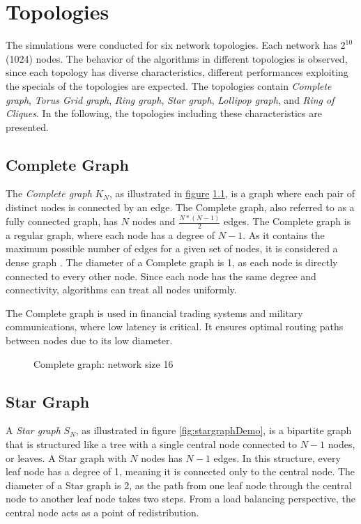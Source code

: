 \chapter{Topologies}\label{chap:topologies}
The simulations were conducted for six network topologies. Each network has $2^{10}$ (1024) nodes. The behavior of the algorithms in different topologies is observed, since each topology has diverse characteristics, different performances exploiting the specials of the topologies are expected. The topologies contain \textit{Complete graph}, \textit{Torus Grid graph}, \textit{Ring graph}, \textit{Star graph}, \textit{Lollipop graph}, and \textit{Ring of Cliques}. In the following, the topologies including these characteristics are presented.

\section{Complete Graph}\label{sec:2completegraph}
The \textit{Complete graph} $K_N$, as illustrated in \hyperref[fig:completegraphDemo]{figure} \ref{fig:completegraphDemo}, is a graph where each pair of distinct nodes is connected by an edge. The Complete graph, also referred to as a fully connected graph, has $N$ nodes and $\frac{N*(N-1)}{2}$ edges. The Complete graph is a regular graph, where each node has a degree of $N-1$. As it contains the maximum possible number of edges for a given set of nodes, it is considered a dense graph \cite{GraphTheorySchindelhaauer2021}. The diameter of a Complete graph is 1, as each node is directly connected to every other node. Since each node has the same degree and connectivity, algorithms can treat all nodes uniformly.

The Complete graph is used in financial trading systems and military communications, where low latency is critical. It ensures optimal routing paths between nodes due to its low diameter. \cite{Banerjee2001}

\begin{figure}[H]
    \centering
    
    \caption{Complete graph: network size 16}
    \label{fig:completegraphDemo}
\end{figure}

\section{Star Graph}\label{sec:2stargraph}
A \textit{Star graph} $S_N$, as illustrated in figure \ref{fig:stargraphDemo}, is a bipartite graph \cite{west2001introduction} that is structured like a tree with a single central node connected to $N-1$ nodes, or leaves. A Star graph with $N$ nodes has $N-1$ edges. In this structure, every leaf node has a degree of 1, meaning it is connected only to the central node. The diameter of a Star graph is 2, as the path from one leaf node through the central node to another leaf node takes two steps. From a load balancing perspective, the central node acts as a point of redistribution.

